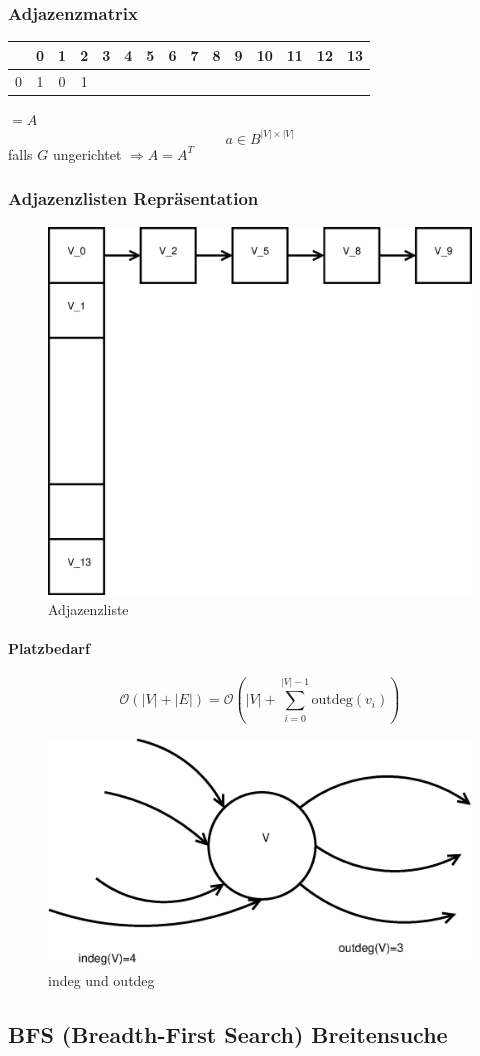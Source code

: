 \subsubsection{Adjazenzmatrix}
\begin{tabular}{|c|cccccccccccccc|}
	\hline
	&0&1&2&3&4&5&6&7&8&9&10&11&12&13 \\ \hline
	0&1&0&1
	
\end{tabular}$= A$
\[ a\in B^{|V|\times |V|} \]
falls $G$ ungerichtet $\Rightarrow A = A^T$
\subsubsection{Adjazenzlisten Repräsentation}
\begin{figure}[h]
\centering
\includegraphics[width=0.5\linewidth]{15/Grafik/Liste}
\caption{Adjazenzliste}
\label{fig:Liste}
\end{figure}


\paragraph{Platzbedarf}
\[ \mathcal{O}(|V|+|E|)=\mathcal{O}\left( |V|+\sum_{i=0}^{|V|-1}\text{outdeg}(v_i) \right) \]
\begin{figure}[h]
\centering
\includegraphics[width=0.5\linewidth]{15/Grafik/deg}
\caption{indeg und outdeg}
\label{fig:deg}
\end{figure}

\subsection{BFS (Breadth-First Search) Breitensuche}
